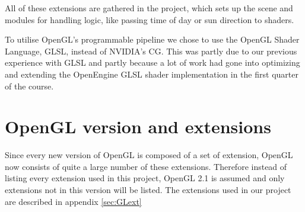 All of these extensions are gathered in the  project,
which sets up the scene and modules for handling logic, like passing
time of day or sun direction to shaders.


To utilise OpenGL's programmable pipeline we chose to use the OpenGL
Shader Language, GLSL, instead of NVIDIA's CG. This was partly due to
our previous experience with GLSL and partly because a lot of work had
gone into optimizing and extending the OpenEngine GLSL shader
implementation in the first quarter of the course.

\section{OpenGL version and extensions}

Since every new version of OpenGL is composed of a set of extension,
OpenGL now consists of quite a large number of these
extensions. Therefore instead of listing every extension used in this
project, OpenGL 2.1 is assumed and only extensions not in this version
will be listed. The extensions used in our project are described in
appendix \ref{sec:GLext}

